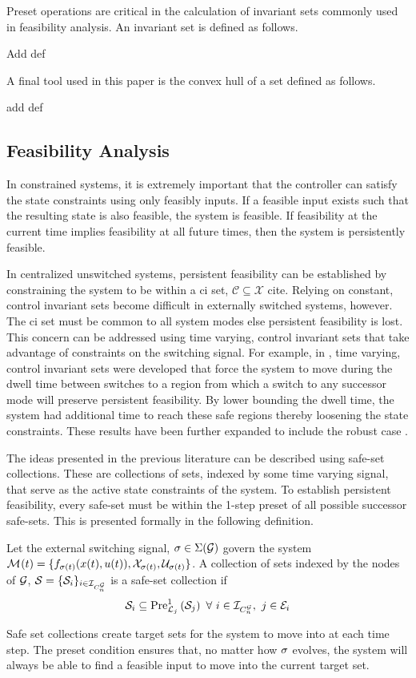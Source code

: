 Preset operations are critical in the calculation of invariant sets commonly used in feasibility analysis. An invariant set is defined as follows.
\begin{definition}[\Ac{ci} Set]\label{def:ci_set}
\alert{Add def}
\end{definition}

A final tool used in this paper is the convex hull of a set defined as follows.
\begin{definition}
\alert{add def}
\end{definition}
\subsection{Feasibility Analysis}
In constrained systems, it is extremely important that the controller can satisfy the state constraints using only feasibly inputs. If a feasible input exists such that the resulting state is also feasible, the system is feasible. If feasibility at the current time implies feasibility at all future times, then the system is persistently feasible.

In centralized unswitched systems, persistent feasibility can be established by constraining the system to be within a \ac{ci} set, $\mathcal{C}\subseteq\mathcal{X}$ \alert{cite}. Relying on constant, control invariant sets become difficult in externally switched systems, however. The \ac{ci} set must be common to all system modes else persistent feasibility is lost. This concern can be addressed using time varying, control invariant sets that take advantage of constraints on the switching signal. For example, in \cite{Danielson2019,Santis2004}, time varying, control invariant sets were developed that force the system to move during the dwell time between switches to a region from which a switch to any successor mode will preserve persistent feasibility. By lower bounding the dwell time, the system had additional time to reach these safe regions thereby loosening the state constraints. These results have been further expanded to include the robust case \cite{Lavaei2021}.

The ideas presented in the previous literature can be described using safe-set collections. These are collections of sets, indexed by some time varying signal, that serve as the active state constraints of the system. To establish persistent feasibility, every safe-set must be within the 1-step preset of all possible successor safe-sets. This is presented formally in the following definition.
\begin{definition}
Let the external switching signal, $\ss\in\Sigma(\graph)$ govern the system $\mode{}(t)=\{f_{\ss(t)}(x(t),u(t)),\xcon[\ss(t)],\ucon[\ss(t)]\}$. A collection of sets indexed by the nodes of $\graph$, $\mathcal{S}=\{\mathcal{S}_{i}\}_{i\in\idxset{\gnumnodes}}$ is a safe-set collection if
$$\mathcal{S}_{i}\subseteq\Pre[\gnodelabel{j}][1]{\mathcal{S}_{j}}\ \forall\ i\in\idxset{\gnumnodes},\ j\in \gnodeedges{i}$$
\end{definition}
Safe set collections create target sets for the system to move into at each time step. The preset condition ensures that, no matter how $\ss$ evolves, the system will always be able to find a feasible input to move into the current target set.
